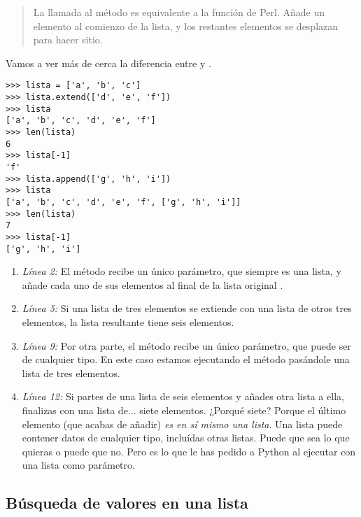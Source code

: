 \begin{quote}
La llamada al método  es equivalente a la función  de Perl. Añade un elemento al comienzo de la lista, y los restantes elementos se desplazan para hacer sitio.
\end{quote}

Vamos a ver más de cerca la diferencia entre  y .

\noindent\begin{minipage}{\textwidth}
\begin{lstlisting}[mathescape=True]
>>> lista = ['a', 'b', 'c']
>>> lista.extend(['d', 'e', 'f'])
>>> lista
['a', 'b', 'c', 'd', 'e', 'f']
>>> len(lista)
6
>>> lista[-1]
'f'
>>> lista.append(['g', 'h', 'i'])
>>> lista
['a', 'b', 'c', 'd', 'e', 'f', ['g', 'h', 'i']]
>>> len(lista)
7
>>> lista[-1]
['g', 'h', 'i']
\end{lstlisting}
\end{minipage}

\begin{enumerate}

\item \emph{Línea 2:} El método  recibe un único parámetro, que siempre es una lista, y añade cada uno de sus elementos al final de la lista original .

\item \emph{Línea 5:} Si una lista de tres elementos se extiende con una lista de otros tres elementos, la lista resultante tiene seis elementos.

\item \emph{Línea 9:} Por otra parte, el método  recibe un único parámetro, que puede ser de cualquier tipo. En este caso estamos ejecutando el método pasándole una lista de tres elementos.

\item \emph{Línea 12:} Si partes de una lista de seis elementos y añades otra lista a ella, finalizas con una lista de... siete elementos. ¿Porqué siete? Porque el último elemento (que acabas de añadir) \emph{es en sí mismo una lista}. Una lista puede contener datos de cualquier tipo, incluídas otras listas. Puede que sea lo que quieras o puede que no. Pero es lo que le has pedido a Python al ejecutar  con una lista como parámetro. 

\end{enumerate}

\subsection{Búsqueda de valores en una lista}

